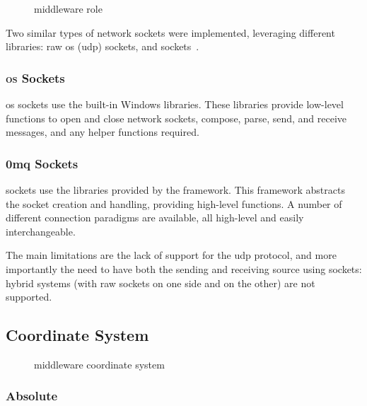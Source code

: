 \begin{figure}[!ht]
	\FLOATcenter{}

    \caption{\gls{middleware} role}\label{im:software:middleware}
\end{figure}

Two similar types of network sockets were implemented, leveraging different libraries: raw \gls{os} (\gls{udp}) sockets, and  sockets~\cite{software:zmq}.

\subsubsection{\textsc{os} Sockets}

\gls{os} sockets use the built-in Windows  libraries. These libraries provide low-level functions to open and close network sockets, compose, parse, send, and receive messages, and any helper functions required.

\subsubsection{0mq Sockets}

 sockets use the libraries provided by the  framework. This framework abstracts the socket creation and handling, providing high-level functions. A number of different connection paradigms are available, all high-level and easily interchangeable.

The main limitations are the lack of support for the \gls{udp} protocol, and more importantly the need to have both the sending and receiving source using  sockets: hybrid systems (with raw sockets on one side and  on the other) are not supported.

\subsection{Coordinate System}

\begin{figure}[!ht]
	\FLOATcenter{}

    \caption{\gls{middleware} coordinate system}\label{im:software:midcoords}
\end{figure}

\subsubsection{Absolute}

